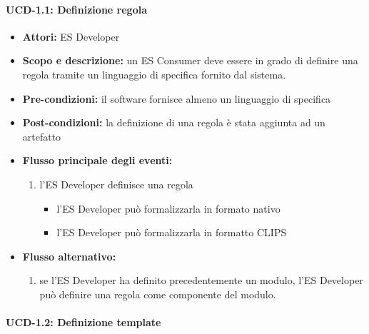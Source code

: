 \paragraph{UCD-1.1: Definizione regola}

\begin{itemize}
	\item \textbf{Attori:} ES Developer
	\item \textbf{Scopo e descrizione:} un ES Consumer deve essere in grado di definire una regola tramite un linguaggio di specifica fornito dal sistema.
	\item \textbf{Pre-condizioni:} il software fornisce almeno un linguaggio di specifica
	\item \textbf{Post-condizioni:} la definizione di una regola è stata aggiunta ad un artefatto
	\item \textbf{Flusso principale degli eventi:}
		\begin{enumerate}
			\item l'ES Developer definisce una regola
			\begin{itemize}
				\item l'ES Developer può formalizzarla in formato nativo
				\item l'ES Developer può formalizzarla in formatto CLIPS
			\end{itemize}
		\end{enumerate}
	\item \textbf{Flusso alternativo:}
		\begin{enumerate}
			\item se l'ES Developer ha definito precedentemente un modulo, l'ES Developer può definire una regola come componente del modulo.
		\end{enumerate}
\end{itemize}




\paragraph{UCD-1.2: Definizione template}


